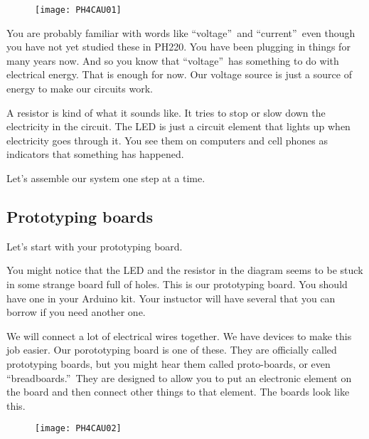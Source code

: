 \begin{figure}[h!]
\texttt{[image: PH4CAU01]}
\end{figure}You are probably familiar with
words like \textquotedblleft voltage\textquotedblright\ and
\textquotedblleft current\textquotedblright\ even though you have not yet
studied these in PH220. You have been plugging in things for many years now.
And so you know that \textquotedblleft voltage\textquotedblright\ has
something to do with electrical energy. That is enough for now. Our voltage
source is just a source of energy to make our circuits work.

A resistor is kind of what it sounds like. It tries to stop or slow down the
electricity in the circuit. The LED is just a circuit element that lights up
when electricity goes through it. You see them on computers and cell phones
as indicators that something has happened.

Let's assemble our system one step at a time.

\subsection{Prototyping boards}

Let's start with your prototyping board.

You might notice that the LED and the resistor in the diagram seems to be
stuck in some strange board full of holes. This is our prototyping board.
You should have one in your Arduino kit. Your instuctor will have several
that you can borrow if you need another one.

We will connect a lot of electrical wires together. We have devices to make
this job easier. Our porototyping board is one of these. They are officially
called prototyping boards, but you might hear them called proto-boards, or
even \textquotedblleft breadboards.\textquotedblright\ They are designed to
allow you to put an electronic element on the board and then connect other
things to that element. The boards look like this. \begin{figure}[h!]
\texttt{[image: PH4CAU02]}
\end{figure}

